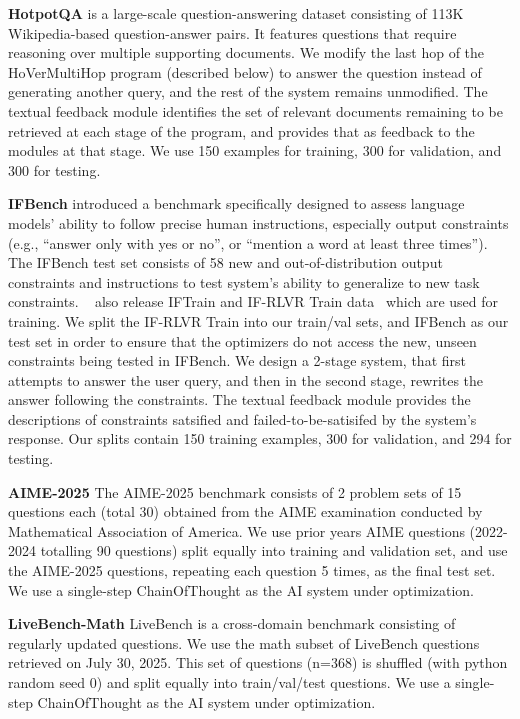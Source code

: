 \documentclass{article} %
\begin{document}
\textbf{HotpotQA} \citep{hotpotqa_bench} is a large-scale question-answering dataset consisting of 113K Wikipedia-based question-answer pairs. It features questions that require reasoning over multiple supporting documents. We modify the last hop of the HoVerMultiHop program (described below) to answer the question instead of generating another query, and the rest of the system remains unmodified. The textual feedback module identifies the set of relevant documents remaining to be retrieved at each stage of the program, and provides that as feedback to the modules at that stage. We use 150 examples for training, 300 for validation, and 300 for testing.

\textbf{IFBench} \citep{ifbench_bench} introduced a benchmark specifically designed to assess language models' ability to follow precise human instructions, especially output constraints (e.g., “answer only with yes or no”, or “mention a word at least three times”). The IFBench test set consists of 58 new and out-of-distribution output constraints and instructions to test system's ability to generalize to new task constraints. ~\citet{ifbench_bench} also release IFTrain and IF-RLVR Train data~\citep{if_rlvr_train} which are used for training. We split the IF-RLVR Train into our train/val sets, and IFBench as our test set in order to ensure that the optimizers do not access the new, unseen constraints being tested in IFBench. We design a 2-stage system, that first attempts to answer the user query, and then in the second stage, rewrites the answer following the constraints. The textual feedback module provides the descriptions of constraints satsified and failed-to-be-satisifed by the system's response. Our splits contain 150 training examples, 300 for validation, and 294 for testing.

\textbf{AIME-2025} \citep{aime_2025} The AIME-2025 benchmark consists of 2 problem sets of 15 questions each (total 30) obtained from the AIME examination conducted by Mathematical Association of America. We use prior years AIME questions (2022-2024 totalling 90 questions) split equally into training and validation set, and use the AIME-2025 questions, repeating each question 5 times, as the final test set. We use a single-step ChainOfThought as the AI system under optimization.

\textbf{LiveBench-Math} \cite{livebench} LiveBench is a cross-domain benchmark consisting of regularly updated questions. We use the math subset of LiveBench questions retrieved on July 30, 2025. This set of questions (n=368) is shuffled (with python random seed 0) and split equally into train/val/test questions. We use a single-step ChainOfThought as the AI system under optimization.
\end{document}
